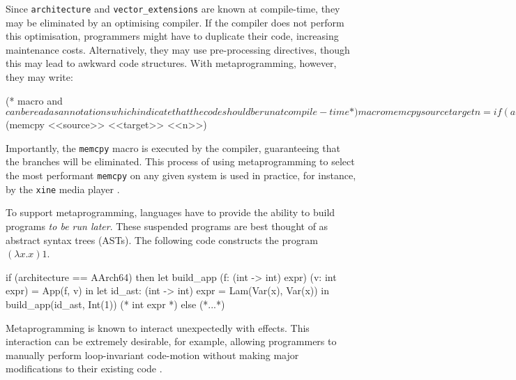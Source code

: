 Since \texttt{architecture} and \texttt{vector_extensions} are known at compile-time, they may be eliminated by an optimising compiler. If the compiler does not perform this optimisation, programmers might have to duplicate their code, increasing maintenance costs. Alternatively, they may use pre-processing directives, though this may lead to awkward code structures. With metaprogramming, however, they may write: 
\begin{macocaml}
(* macro and $ can be read as annotations which 
   indicate that the code should be run at compile-time *)
macro memcpy source target n = if (architecture == AArch64) then 
                               (* generate this program, to be run later *)
                               else 
                                 match vector_extensions with
                                 | None -> (* generate this program *)
                                 | Some(AVX512) -> (* generate this program *)
                                 | ...
$(memcpy <<source>> <<target>> <<n>>)
\end{macocaml}
Importantly, the \texttt{memcpy} macro is executed by the compiler, guaranteeing that the branches will be eliminated. This process of using metaprogramming to select the most performant \texttt{memcpy} on any given system is used in practice, for instance, by the \texttt{xine} media player \citep{huceke-memcpy}.

To support metaprogramming, languages have to provide the ability to build programs \textit{to be run later}. These suspended programs are best thought of as abstract syntax trees (ASTs). The following code constructs the program $(\lambda x. x) 1$.
\begin{ocaml}
if (architecture == AArch64) then 
  let build_app (f: (int -> int) expr) (v: int expr) = App(f, v) in
  let id_ast: (int -> int) expr = Lam(Var(x), Var(x)) in
  build_app(id_ast, Int(1)) (* int expr *)
else 
  (*...*)
\end{ocaml}

Metaprogramming is known to interact unexpectedly with effects. This interaction can be extremely desirable, for example, allowing programmers to manually perform loop-invariant code-motion \citep{kiselyov-14} without making major modifications to their existing code \citep{lawall-94}. 

